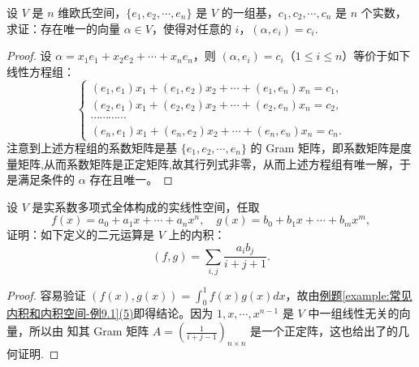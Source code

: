 \documentclass[../../main.tex]{subfiles}
\begin{document}
\begin{proposition}\label{proposition:例9.7}
设 $V$ 是 $n$ 维欧氏空间，$\{e_1,e_2,\cdots,e_n\}$ 是 $V$ 的一组基，$c_1,c_2,\cdots,c_n$ 是 $n$ 个实数，求证：存在唯一的向量 $\alpha\in V$，使得对任意的 $i$，$(\alpha,e_i)=c_i$.
\end{proposition}
\begin{proof}
设 $\alpha = x_1e_1 + x_2e_2 + \cdots + x_ne_n$，则 $(\alpha,e_i)=c_i$（$1\leq i\leq n$）等价于如下线性方程组：
\[
\begin{cases}
(e_1,e_1)x_1 + (e_1,e_2)x_2 + \cdots + (e_1,e_n)x_n = c_1,\\
(e_2,e_1)x_1 + (e_2,e_2)x_2 + \cdots + (e_2,e_n)x_n = c_2,\\
\cdots\cdots\cdots\cdots\\
(e_n,e_1)x_1 + (e_n,e_2)x_2 + \cdots + (e_n,e_n)x_n = c_n.
\end{cases}
\]
注意到上述方程组的系数矩阵是基 $\{e_1,e_2,\cdots,e_n\}$ 的 Gram 矩阵，即系数矩阵是度量矩阵,从而系数矩阵是正定矩阵,故其行列式非零，从而上述方程组有唯一解，于是满足条件的 $\alpha$ 存在且唯一。
\end{proof}

\begin{proposition}
设 $V$ 是实系数多项式全体构成的实线性空间，任取
\[
f(x)=a_0 + a_1x + \cdots + a_nx^n,\quad g(x)=b_0 + b_1x + \cdots + b_mx^m,
\]
证明：如下定义的二元运算是 $V$ 上的内积：
\[
(f,g)=\sum_{i,j}\frac{a_ib_j}{i + j + 1}.
\]
\end{proposition}
\begin{proof}
容易验证 $(f(x),g(x)) = \int_{0}^{1}f(x)g(x)dx$，故由\hyperref[example:常见内积和内积空间-例9.1]{例题\ref{example:常见内积和内积空间-例9.1}(5)}即得结论。因为 $1,x,\cdots,x^{n - 1}$ 是 $V$ 中一组线性无关的向量，所以由 知其 Gram 矩阵 $A = \left(\frac{1}{i + j - 1}\right)_{n\times n}$ 是一个正定阵，这也给出了的几何证明.
\end{proof}
\end{document}
